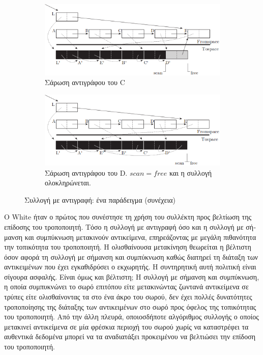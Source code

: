\begin{greek}
\begin{figure}[H]
  \begin{subfigure}[b]{1.0\textwidth}
    \includegraphics{figures/cop_2b}
    \caption{Σάρωση αντιγράφου του C}
  \end{subfigure}
  
  \begin{subfigure}[b]{1.0\textwidth}
    \includegraphics{figures/cop_2c}
    \caption{Σάρωση αντιγράφου του D. $scan=free$ και η 
             συλλογή ολοκληρώνεται.}
  \end{subfigure}
  \caption{Συλλογή με αντιγραφή: ένα παράδειγμα (συνέχεια)}
  \label{fig:cop_2}
\end{figure}

O White \cite{DBLP:conf/lfp/White80} ήταν ο πρώτος που συνέστησε τη χρήση του συλλέκτη
προς βελτίωση της επίδοσης του τροποποιητή. Τόσο η συλλογή με
αντιγραφή όσο και η συλλογή με σήμανση και συμπύκνωση μετακινούν
αντικείμενα, επηρεάζοντας με μεγάλη πιθανότητα την τοπικότητα
του τροποποιητή. Η ολισθαίνουσα μετακίνηση θεωρείται η βέλτιστη
όσον αφορά τη συλλογή με σήμανση και συμπύκνωση καθώς διατηρεί
τη διάταξη των αντικειμένων που έχει εγκαθιδρύσει ο εκχωρητής.
Η συντηρητική αυτή πολιτική είναι σίγουρα ασφαλής. Είναι όμως
και βέλτιστη; Η συλλογή με σήμανση και συμπύκνωση, η οποία 
συμπυκνώνει το σωρό επιτόπου είτε μετακινώντας ζωντανά αντικείμενα 
σε τρύπες είτε ολισθαίνοντας τα στο ένα άκρο του σωρού, δεν
έχει πολλές δυνατότητες τροποποίησης της διάταξης των αντικειμένων 
στο σωρό προς όφελος της τοπικότητας του τροποποιητή. Από την
άλλη πλευρά, οποιοσδήποτε αλγόριθμος συλλογής ο οποίος μετακινεί 
αντικείμενα σε μία φρέσκια περιοχή του σωρού χωρίς να καταστρέφει
τα αυθεντικά δεδομένα μπορεί να τα αναδιατάξει προκειμένου να
βελτιώσει την επίδοση του τροποποιητή.


\end{greek}
